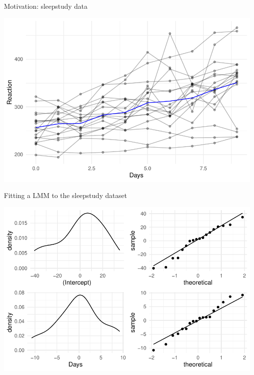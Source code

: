 \begin{frame}{Motivation: sleepstudy data}
\protect\hypertarget{motivation-sleepstudy-data-1}{}

\begin{center}\includegraphics[width=0.85\linewidth]{codes_files/figure-beamer/data-1} \end{center}

\end{frame}

\begin{frame}[fragile]{Fitting a LMM to the sleepstudy dataset}
\protect\hypertarget{fitting-a-lmm-to-the-sleepstudy-dataset}{}

\vspace{-.2cm}
\begin{Shaded}
\begin{Highlighting}[]
\StringTok{ }\OperatorTok{~}
            \OperatorTok{~}\OperatorTok{|}
\end{Highlighting}
\end{Shaded}

\begin{center}\includegraphics[width=0.7\linewidth]{codes_files/figure-beamer/fit1plot-1} \end{center}

\end{frame}

